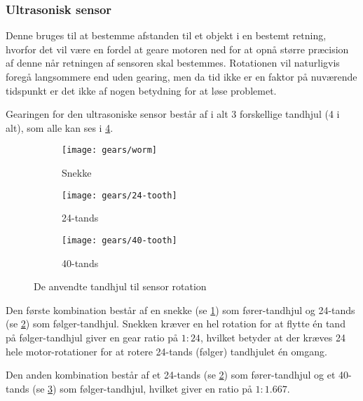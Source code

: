 \subsubsection{Ultrasonisk sensor}
Denne bruges til at bestemme afstanden til et objekt i en bestemt retning, hvorfor det vil være en fordel at geare motoren ned for at opnå større præcision af denne når retningen af sensoren skal bestemmes.
Rotationen vil naturligvis foregå langsommere end uden gearing, men da tid ikke er en faktor på nuværende tidspunkt er det ikke af nogen betydning for at løse problemet.

Gearingen for den ultrasoniske sensor består af i alt 3 forskellige tandhjul (4 i alt), som alle kan ses i \cref{gearing:tandhjul}.

\begin{figure}[h] %
\centering
\begin{subfigure}[b]{.19\textwidth}
\centering
\texttt{[image: gears/worm]}
\caption{Snekke}
\label{gearing:snekke}
\end{subfigure}
\begin{subfigure}[b]{.19\textwidth}
\centering
\texttt{[image: gears/24-tooth]}
\caption{24-tands}
\label{gearing:24tand}
\end{subfigure}
\begin{subfigure}[b]{.19\textwidth}
\centering
\texttt{[image: gears/40-tooth]}
\caption{40-tands}
\label{gearing:40tand}
\end{subfigure}
\caption{De anvendte tandhjul til sensor rotation}
\label{gearing:tandhjul}
\end{figure}

Den første kombination består af en snekke\cite{snekke} (se \cref{gearing:snekke}) som fører-tandhjul og 24-tands (se \cref{gearing:24tand}) som følger-tandhjul.
Snekken kræver en hel rotation for at flytte én tand på følger-tandhjul giver en gear ratio på $1:24$, hvilket betyder at der kræves 24 hele motor-rotationer for at rotere 24-tands (følger) tandhjulet én omgang.

Den anden kombination består af et 24-tands (se \cref{gearing:24tand}) som fører-tandhjul og et 40-tands (se \cref{gearing:40tand}) som følger-tandhjul, hvilket giver en ratio på $1:1.667$.

